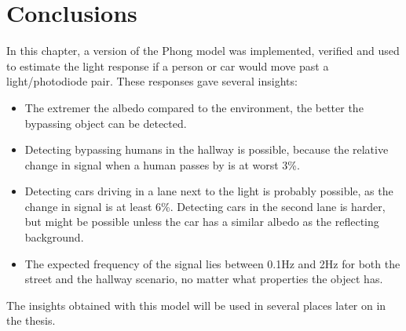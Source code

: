\section{Conclusions}
In this chapter, a version of the Phong model was implemented, verified and used to estimate the light response if a person or car would move past a light/photodiode pair. These responses gave several insights:
\begin{itemize}[itemsep=-1ex,topsep=0pt]
	\item The extremer the albedo compared to the environment, the better the bypassing object can be detected.
	\item Detecting bypassing humans in the hallway is possible, because the relative change in signal when a human passes by is at worst 3\%.
	\item Detecting cars driving in a lane next to the light is probably possible, as the change in signal is at least 6\%. Detecting cars in the second lane is harder, but might be possible unless the car has a similar albedo as the reflecting background.
	\item The expected frequency of the signal lies between 0.1Hz and 2Hz for both the street and the hallway scenario, no matter what properties the object has.
\end{itemize}
The insights obtained with this model will be used in several places later on in the thesis.